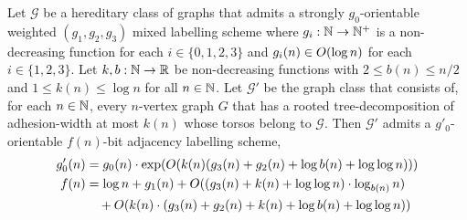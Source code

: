 \begin{lem}\label{lem:the_big_one}
  Let $\mathcal{G}$ be a hereditary class of graphs that admits a strongly $g_0$-orientable weighted $(g_1,g_2,g_3)$ mixed labelling scheme where $g_i:\mathbb{N}\to\mathbb{N}^+$ is a non-decreasing function for each $i\in\{0,1,2,3\}$ and $g_i(n)\in O(\log n)$ for each $i\in\{1,2,3\}$. Let $k,b:\mathbb{N}\to\mathbb{R}$ be non-decreasing functions with $2\le b(n)\le n/2$ and $1\le k(n)\le \log n$ for all $n\in\mathbb{N}$.  Let $\mathcal{G}'$ be the graph class that consists of, for each $n\in\mathbb{N}$, every $n$-vertex graph $G$ that has a rooted tree-decomposition of adhesion-width at most $k(n)$ whose torsos belong to $\mathcal{G}$. 
  Then $\mathcal{G}'$ admits a $g'_0$-orientable $f(n)$-bit adjacency labelling scheme,
  \begin{align*}
    g_0'(n) & = g_0(n)\cdot \exp(O(k(n)(g_3(n)+g_2(n)+\log b(n)+\log\log n))) \\
    f(n) & = \log n + g_1(n) + O((g_3(n)+k(n)+\log\log n)\cdot \log_{b(n)} n) \\
    & \quad + O(k(n)\cdot (g_3(n)+g_2(n) + k(n) + \log b(n) + \log\log n ))   \end{align*}
\end{lem}

